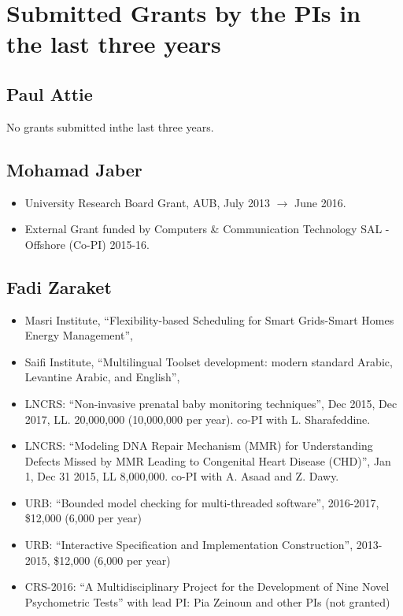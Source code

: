 \section{Submitted Grants by the PIs in the last three years}

\subsection{Paul Attie}

No grants submitted inthe last three years.



\subsection{Mohamad Jaber}
\begin{itemize}
\item{University Research Board Grant, AUB, July 2013 $\rightarrow$ June 2016.}
\item{External Grant funded by Computers \& Communication Technology SAL - Offshore (Co-PI) 2015-16.}
\end{itemize}


\subsection{Fadi Zaraket}

\begin{itemize}
\item Masri Institute, ``Flexibility-based Scheduling for Smart Grids-Smart Homes Energy Management'', 

\item Saifi Institute, ``Multilingual Toolset development: modern standard Arabic, Levantine Arabic, and English'', 

\item LNCRS: ``Non-invasive prenatal baby monitoring techniques'', 
  Dec 2015, Dec 2017, LL. 20,000,000 (10,000,000 per year). co-PI with L. Sharafeddine. 

\item LNCRS: ``Modeling DNA Repair Mechanism (MMR) for Understanding Defects Missed by MMR Leading to  Congenital Heart Disease (CHD)'',
    Jan 1, Dec 31 2015, LL 8,000,000.  co-PI with A. Asaad and Z. Dawy. 

\item URB: ``Bounded model checking for multi-threaded software'', 2016-2017, \$12,000 (6,000 per year) 

\item URB: ``Interactive Specification and Implementation Construction'', 2013-2015, \$12,000 (6,000 per year) 

\item CRS-2016: ``A Multidisciplinary Project for the Development of Nine Novel Psychometric Tests'' with lead PI: Pia Zeinoun and other PIs (not granted) 
\end{itemize}

